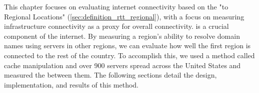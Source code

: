 This chapter focuses on evaluating internet connectivity based on the "\rtt to Regional Locations" (\cref{sec:definition_rtt_regional}), with a focus on measuring \dns infrastructure connectivity as a proxy for overall connectivity. \dns is a crucial component of the internet. By measuring a region's ability to resolve domain names using servers in other regions, we can evaluate how well the first region is connected to the rest of the country. To accomplish this, we used a method called \dns cache manipulation and over 900 \dns servers spread across the United States and measured the \rtt between them. The following sections detail the design, implementation, and results of this method.